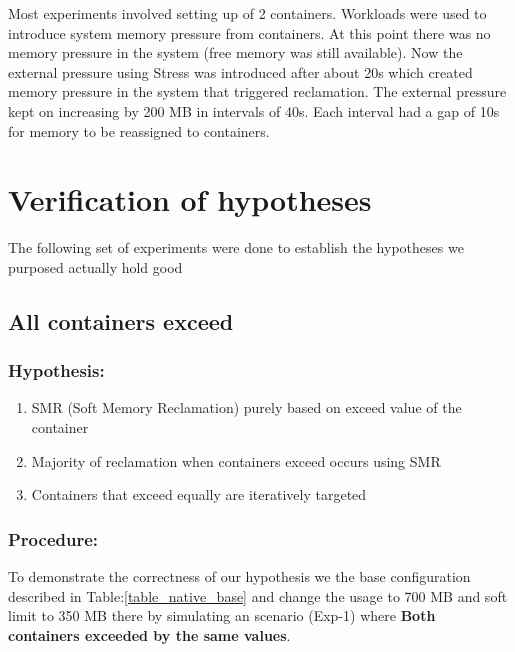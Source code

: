     Most experiments involved setting up of 2 containers. Workloads were used to introduce system memory pressure from containers. At 
this point there was no memory pressure in the system (free memory was still available). Now the external pressure using Stress was 
introduced after about 20s which created memory pressure in the system that triggered reclamation. The external pressure kept on increasing 
by 200 MB in intervals of 40s. Each interval had a gap of 10s for memory to be reassigned to containers.
  

  \section{Verification of hypotheses}
    
    The following set of experiments were done to establish the hypotheses we purposed actually hold good 
    
    \subsection{All containers exceed}
	  
	\subsubsection{Hypothesis:} 
	  \begin{enumerate}
	    \item SMR (Soft Memory Reclamation) purely based on exceed value of the container
	    \item Majority of reclamation when containers exceed occurs using SMR
	    \item Containers that exceed equally are iteratively targeted
	  \end{enumerate} 
	
	\subsubsection{Procedure:}
	  To demonstrate the correctness of our hypothesis we the base configuration described in Table:\ref{table_native_base} and change 
the usage to 700 MB and soft limit to 350 MB there by simulating an scenario (Exp-1) where \textbf{Both containers exceeded by the same 
values}.
	
